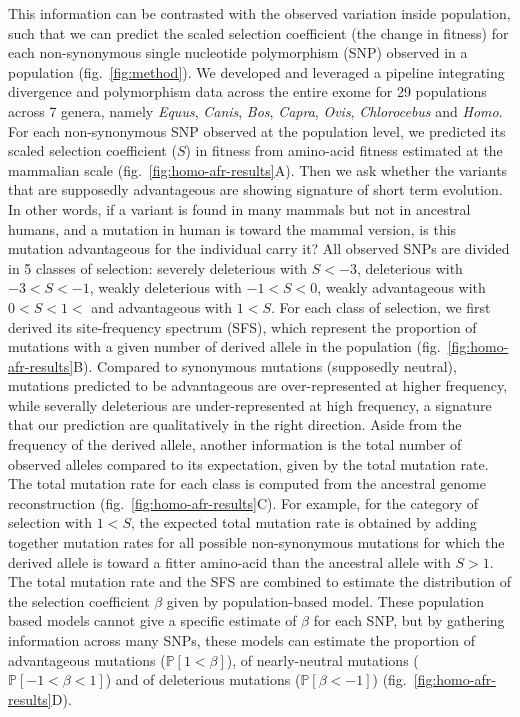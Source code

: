 \documentclass{article}
\newcommand{\proba}{\mathbb{P}}
\newcommand{\Spop}{\beta}
\newcommand{\Sphy}{S}
\newcommand{\polyDel}{\proba \left[ {\Spop < -1} \right]}
\newcommand{\polyNeutral}{\proba \left[ -1 < \Spop < 1 \right]}
\newcommand{\polyAdv}{\proba \left[ 1 < \Spop  \right]}
\begin{document}
    This information can be contrasted with the observed variation inside population, such that we can predict the scaled selection coefficient (the change in fitness) for each non-synonymous single nucleotide polymorphism (SNP) observed in a population (fig.~\ref{fig:method}).
    We developed and leveraged a pipeline integrating divergence and polymorphism data across the entire exome for 29 populations across 7 genera, namely \textit{Equus}, \textit{Canis}, \textit{Bos}, \textit{Capra}, \textit{Ovis}, \textit{Chlorocebus} and \textit{Homo}.
    For each non-synonymous SNP observed at the population level, we predicted its scaled selection coefficient ($\Sphy$) in fitness from amino-acid fitness estimated at the mammalian scale (fig.~\ref{fig:homo-afr-results}A).
    Then we ask whether the variants that are supposedly advantageous are showing signature of short term evolution.
    In other words, if a variant is found in many mammals but not in ancestral humans, and a mutation in human is toward the mammal version, is this mutation advantageous for the individual carry it?
    All observed SNPs are divided in 5 classes of selection: severely deleterious with $\Sphy<-3$, deleterious with $-3<\Sphy<-1$, weakly deleterious with $-1<\Sphy<0$, weakly advantageous with $0<\Sphy<1<$ and advantageous with $1<\Sphy$.
    For each class of selection, we first derived its site-frequency spectrum (SFS), which represent the proportion of mutations with a given number of derived allele in the population (fig.~\ref{fig:homo-afr-results}B).
    Compared to synonymous mutations (supposedly neutral), mutations predicted to be advantageous are over-represented at higher frequency, while severally deleterious are under-represented at high frequency, a signature that our prediction are qualitatively in the right direction.
    Aside from the frequency of the derived allele, another information is the total number of observed alleles compared to its expectation, given by the total mutation rate.
    The total mutation rate for each class is computed from the ancestral genome reconstruction (fig.~\ref{fig:homo-afr-results}C).
    For example, for the category of selection with $1<\Sphy$, the expected total mutation rate is obtained by adding together mutation rates for all possible non-synonymous mutations for which the derived allele is toward a fitter amino-acid than the ancestral allele with $\Sphy > 1$.
    The total mutation rate and the SFS are combined to estimate the distribution of the selection coefficient $\Spop$ given by population-based model\cite{tataru_inference_2017, tataru_polydfe_2020}.
    These population based models cannot give a specific estimate of $\Spop$ for each SNP, but by gathering information across many SNPs, these models can estimate the proportion of advantageous mutations ($\polyAdv$), of nearly-neutral mutations ($\polyNeutral$) and of deleterious mutations ($\polyDel$) (fig.~\ref{fig:homo-afr-results}D).
\end{document}
